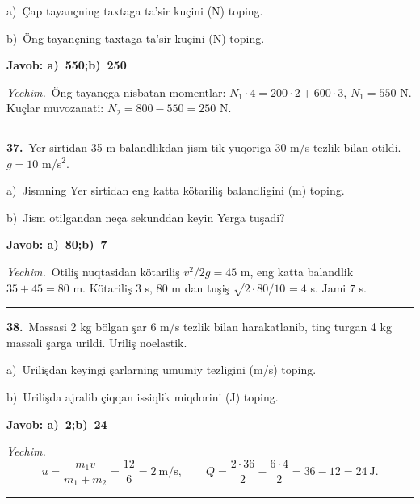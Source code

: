 \documentclass[11pt,a4paper]{article}
\begin{document}
\noindent\hspace*{4mm}a)\ Çap tayançning taxtaga ta’sir kuçini (N) toping.\par
\noindent\hspace*{4mm}b)\ Öng tayançning taxtaga ta’sir kuçini (N) toping.\par
\noindent\colorbox{gray!12}{\parbox{\dimexpr\linewidth-2\fboxsep}{\textbf{Javob: a)\ 550;\quad b)\ 250}}}\par\smallskip
\noindent\textit{Yechim.}\ Öng tayançga nisbatan momentlar: $N_1\cdot4=200\cdot2+600\cdot3$, $N_1=550$ N. Kuçlar muvozanati: $N_2=800-550=250$ N.\par\par\medskip\hrule\medskip
{}\noindent\textbf{37.}\ Yer sirtidan 35 m balandlikdan jism tik yuqoriga 30 m/s tezlik bilan otildi. $g=10$ m/s$^2$.\par
\noindent\hspace*{4mm}a)\ Jismning Yer sirtidan eng katta kötariliş balandligini (m) toping.\par
\noindent\hspace*{4mm}b)\ Jism otilgandan neça sekunddan keyin Yerga tuşadi?\par
\noindent\colorbox{gray!12}{\parbox{\dimexpr\linewidth-2\fboxsep}{\textbf{Javob: a)\ 80;\quad b)\ 7}}}\par\smallskip
\noindent\textit{Yechim.}\ Otiliş nuqtasidan kötariliş $v^2/2g=45$ m, eng katta balandlik $35+45=80$ m. Kötariliş 3 s, 80 m dan tuşiş $\sqrt{2\cdot80/10}=4$ s. Jami $7$ s.\par\par\medskip\hrule\medskip
{}\noindent\textbf{38.}\ Massasi 2 kg bölgan şar 6 m/s tezlik bilan harakatlanib, tinç turgan 4 kg massali şarga urildi. Uriliş noelastik.\par
\noindent\hspace*{4mm}a)\ Urilişdan keyingi şarlarning umumiy tezligini (m/s) toping.\par
\noindent\hspace*{4mm}b)\ Urilişda ajralib çiqqan issiqlik miqdorini (J) toping.\par
\noindent\colorbox{gray!12}{\parbox{\dimexpr\linewidth-2\fboxsep}{\textbf{Javob: a)\ 2;\quad b)\ 24}}}\par\smallskip
\noindent\textit{Yechim.}\ \[u=\frac{m_1v}{m_1+m_2}=\frac{12}{6}=2\ \text{m/s},\qquad Q=\frac{2\cdot36}{2}-\frac{6\cdot4}{2}=36-12=24\ \text{J}.\]\par\medskip\hrule\medskip
\end{document}
